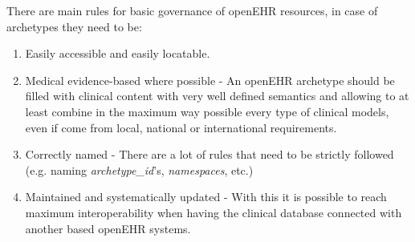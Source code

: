 \documentclass[mim_thesis.tex]{subfiles}
\begin{document}
There are main rules for basic governance of openEHR resources, in case of archetypes they need to be:
\begin{enumerate}[noitemsep]
\item Easily accessible and easily locatable.
\item Medical evidence-based where possible - An openEHR archetype should be filled with clinical content with very well defined semantics and allowing to at least combine in the maximum way possible every type of clinical models, even if come from local, national or international requirements.
\item Correctly named - There are a lot of rules that need to be strictly followed (e.g. naming \textit{archetype\_id}'s, \textit{namespaces}, etc.)
\item Maintained and systematically updated - With this it is possible to reach maximum interoperability when having the clinical database connected with another based openEHR systems. 
\end{enumerate}
\end{document}

